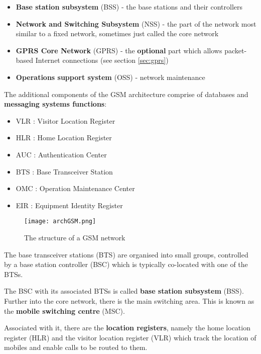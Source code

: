 \begin{itemize}
  \item \textbf{Base station subsystem} (BSS) - the base stations and their
controllers
  \item \textbf{Network and Switching Subsystem} (NSS) - the part of the
network most similar to a fixed network, sometimes just called the core network
  \item \textbf{GPRS Core Network} (GPRS) - the \textbf{optional} part which
allows packet-based Internet connections (see section \ref{sec:gprs})
  \item \textbf{Operations support system} (OSS) - network maintenance
\end{itemize}

The additional components of the GSM architecture comprise of databases and
\textbf{messaging systems functions}:

\begin{itemize}
  \item VLR : Visitor Location Register
  \item HLR : Home Location Register
  \item AUC : Authentication Center
  \item BTS : Base Transceiver Station
  \item OMC : Operation Maintenance Center
  \item EIR : Equipment Identity Register
\end{itemize}

\begin{figure}[H]
  \centering
  \texttt{[image: archGSM.png]}
  \caption{The structure of a GSM network}
  \label{fig:archGSM}
\end{figure}

The base transceiver stations (BTS) are organised into small groups,
controlled by a base station controller (BSC) which is typically co-located
with one of the BTSs.

The BSC with its associated BTSs is called \textbf{base station subsystem}
(BSS). \\

Further into the core network, there is the main switching area.
This is known as the \textbf{mobile switching centre} (MSC).

Associated with it, there are the \textbf{location registers}, namely the home
location register (HLR) and the visitor location register (VLR) which track
the location of mobiles and enable calls to be routed to them. \\

